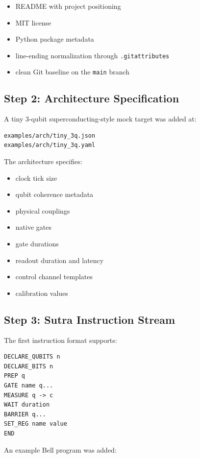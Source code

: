 \documentclass[11pt,a4paper]{article}
\begin{document}
\begin{itemize}[leftmargin=*]
  \item README with project positioning
  \item MIT license
  \item Python package metadata
  \item line-ending normalization through \texttt{.gitattributes}
  \item clean Git baseline on the \texttt{main} branch
\end{itemize}

\subsection{Step 2: Architecture Specification}

A tiny 3-qubit superconducting-style mock target was added at:

\begin{lstlisting}[style=astra]
examples/arch/tiny_3q.json
examples/arch/tiny_3q.yaml
\end{lstlisting}

The architecture specifies:

\begin{itemize}[leftmargin=*]
  \item clock tick size
  \item qubit coherence metadata
  \item physical couplings
  \item native gates
  \item gate durations
  \item readout duration and latency
  \item control channel templates
  \item calibration values
\end{itemize}

\subsection{Step 3: Sutra Instruction Stream}

The first instruction format supports:

\begin{lstlisting}[style=astra]
DECLARE_QUBITS n
DECLARE_BITS n
PREP q
GATE name q...
MEASURE q -> c
WAIT duration
BARRIER q...
SET_REG name value
END
\end{lstlisting}

An example Bell program was added:
\end{document}

